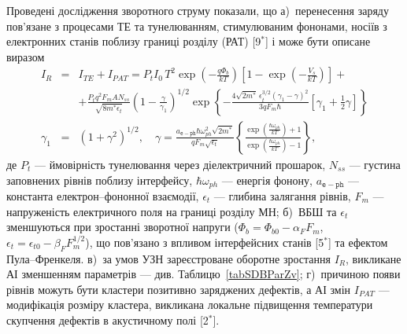 Проведені дослідження зворотного струму показали, що
а)~перенесення заряду пов'язане з процесами ТЕ та тунелюванням, стимулюваним фононами, носіїв з електронних станів поблизу границі розділу (РАТ)
[9$^*$]
і може бути описане виразом
\begin{eqnarray}
\label{eqIgen}
 I_R&=&I_{TE}+I_{P\!AT}=P_tI_0\,T^2\exp\left(-\frac{q\Phi_b}{kT}\right)\left[1-\exp\left(-\frac{V_s}{kT}\right)\right]+\\
 &&+\frac{P_tq^2F_mAN_{ss}}{\sqrt{8m^*\epsilon_t}}\left(1-\frac{\gamma}{\gamma_1}\right)^{1/2}\exp
    \left\{-\frac{4\sqrt{2m^*}\,\epsilon_t^{3/2}\left(\gamma_1-\gamma\right)^2}{3qF_m\hbar} \nonumber
    [\gamma_1+\frac{1}{2}\gamma]\right\}\\ \nonumber
    \gamma_1&=&(1+\gamma^2)^{1/2}, \quad
    \gamma=\frac{a_\mathtt{e-ph}\hbar\omega_{ph}^2\sqrt{2m^*}}{qF_m\sqrt{\epsilon_t}}
    \left\{\frac{\exp\left(\frac{\hbar\omega_{ph}}{kT}\right)+1}{\exp\left(\frac{\hbar\omega_{ph}}{kT}\right)-1}\right\},   \nonumber
\end{eqnarray}
де
$P_t$ --- ймовірність тунелювання через діелектричний прошарок,
$N_{ss}$ --- густина заповнених рівнів поблизу інтерфейсу,
$\hbar\omega_{ph}$ --- енергія фонону,
$a_\mathtt{e-ph}$ --- константа електрон--фононної взаємодії,
$\epsilon_t$ --- глибина залягання рівнів,
$F_m$ --- напруженість електричного поля на границі розділу МН;
б)~ВБШ та $\epsilon_t$ зменшуються при зростанні зворотної напруги
($\Phi_{b}=\Phi_{b0}-\alpha_{F} F_m$,
$\epsilon_t=\epsilon_{t0}-\beta_F F_m^{1/2}$), що пов'язано з впливом інтерфейсних станів
[5$^*$] та ефектом Пула--Френкеля.
в)~за умов УЗН зареєстроване оборотне зростання $I_R$, викликане АІ зменшенням параметрів --- див. Таблицю~\ref{tabSDBParZv};
г)~причиною появи рівнів можуть бути кластери позитивно заряджених дефектів, а АІ змін $I_{P\!AT}$ --- модифікація розміру кластера, викликана
локальне підвищення температури скупчення дефектів в акустичному полі
[2$^*$].



